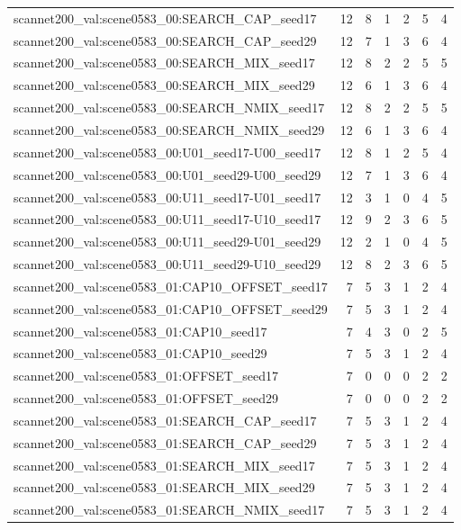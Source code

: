 \begin{table}[t]
\begin{tabular}{lrrrrrr}
scannet200\_val:scene0583\_00:SEARCH\_CAP\_seed17 & 12 & 8 & 1 & 2 & 5 & 4 \\
scannet200\_val:scene0583\_00:SEARCH\_CAP\_seed29 & 12 & 7 & 1 & 3 & 6 & 4 \\
scannet200\_val:scene0583\_00:SEARCH\_MIX\_seed17 & 12 & 8 & 2 & 2 & 5 & 5 \\
scannet200\_val:scene0583\_00:SEARCH\_MIX\_seed29 & 12 & 6 & 1 & 3 & 6 & 4 \\
scannet200\_val:scene0583\_00:SEARCH\_NMIX\_seed17 & 12 & 8 & 2 & 2 & 5 & 5 \\
scannet200\_val:scene0583\_00:SEARCH\_NMIX\_seed29 & 12 & 6 & 1 & 3 & 6 & 4 \\
scannet200\_val:scene0583\_00:U01\_seed17-U00\_seed17 & 12 & 8 & 1 & 2 & 5 & 4 \\
scannet200\_val:scene0583\_00:U01\_seed29-U00\_seed29 & 12 & 7 & 1 & 3 & 6 & 4 \\
scannet200\_val:scene0583\_00:U11\_seed17-U01\_seed17 & 12 & 3 & 1 & 0 & 4 & 5 \\
scannet200\_val:scene0583\_00:U11\_seed17-U10\_seed17 & 12 & 9 & 2 & 3 & 6 & 5 \\
scannet200\_val:scene0583\_00:U11\_seed29-U01\_seed29 & 12 & 2 & 1 & 0 & 4 & 5 \\
scannet200\_val:scene0583\_00:U11\_seed29-U10\_seed29 & 12 & 8 & 2 & 3 & 6 & 5 \\
scannet200\_val:scene0583\_01:CAP10\_OFFSET\_seed17 & 7 & 5 & 3 & 1 & 2 & 4 \\
scannet200\_val:scene0583\_01:CAP10\_OFFSET\_seed29 & 7 & 5 & 3 & 1 & 2 & 4 \\
scannet200\_val:scene0583\_01:CAP10\_seed17 & 7 & 4 & 3 & 0 & 2 & 5 \\
scannet200\_val:scene0583\_01:CAP10\_seed29 & 7 & 5 & 3 & 1 & 2 & 4 \\
scannet200\_val:scene0583\_01:OFFSET\_seed17 & 7 & 0 & 0 & 0 & 2 & 2 \\
scannet200\_val:scene0583\_01:OFFSET\_seed29 & 7 & 0 & 0 & 0 & 2 & 2 \\
scannet200\_val:scene0583\_01:SEARCH\_CAP\_seed17 & 7 & 5 & 3 & 1 & 2 & 4 \\
scannet200\_val:scene0583\_01:SEARCH\_CAP\_seed29 & 7 & 5 & 3 & 1 & 2 & 4 \\
scannet200\_val:scene0583\_01:SEARCH\_MIX\_seed17 & 7 & 5 & 3 & 1 & 2 & 4 \\
scannet200\_val:scene0583\_01:SEARCH\_MIX\_seed29 & 7 & 5 & 3 & 1 & 2 & 4 \\
scannet200\_val:scene0583\_01:SEARCH\_NMIX\_seed17 & 7 & 5 & 3 & 1 & 2 & 4 \\

\end{tabular}
\end{table}
